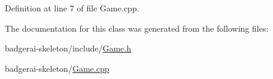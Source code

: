 Definition at line 7 of file Game.\-cpp.


\begin{DoxyCode}
{
}
\end{DoxyCode}


The documentation for this class was generated from the following files\-:\begin{DoxyCompactItemize}
\item 
badgerai-\/skeleton/include/\hyperlink{Game_8h}{Game.\-h}\item 
badgerai-\/skeleton/\hyperlink{Game_8cpp}{Game.\-cpp}\end{DoxyCompactItemize}
